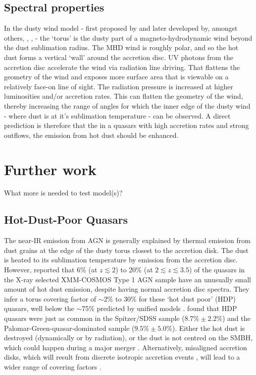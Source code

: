 \subsection{Spectral properties}

In the dusty wind model - first proposed by \citet{konigl94} and later developed by, amongst others, \citet{everett05}, \citet{elitzur06}, \citet{keating12} - the `torus' is the dusty part of a magneto-hydrodynamic wind beyond the dust sublimation radius. 
The MHD wind is roughly polar, and so the hot dust forms a vertical `wall' around the accretion disc.  
UV photons from the accretion disc accelerate the wind via radiation line driving. 
That flattens the geometry of the wind and exposes more surface area that is viewable on a relatively face-on line of sight.  
The radiation pressure is increased at higher luminosities and/or accretion rates.
This can flatten the geometry of the wind, thereby increasing the range of angles for which the inner edge of the dusty wind - where dust is at it's sublimation temperature - can be observed. 
A direct prediction is therefore that the in a quasars with high accretion rates and strong outflows, the emission from hot dust should be enhanced. 


\section{Further work}

What more is needed to test model(s)?  

\subsection{Hot-Dust-Poor Quasars}

The near-IR emission from AGN is generally explained by thermal emission from dust grains at the edge of the dusty torus closest to the accretion disk. 
The dust is heated to its sublimation temperature \citep[1300-2000K][]{barvainis92} by emission from the accretion disc. However, \citet{hao10} reported that 6\% (at $z \lesssim 2$) to 20\% (at $2 \lesssim z \lesssim 3.5$) of the quasars in the X-ray selected XMM-COSMOS Type 1 AGN sample \citep{brusa10} have an unusually small amount of hot dust emission, despite having normal accretion disc spectra. 
They infer a torus covering factor of  $\sim$2\% to 30\% for these `hot dust poor' (HDP) quasars, well below the $\sim$75\% predicted by unified models \citep[e.g.][]{krolik88}. 
\citet{hao11} found that HDP quasars were just as common in the \citet{richards06} Spitzer/SDSS sample ($8.7\% \pm 2.2\%$) and the \citet{elvis94} Palomar-Green-quasar-dominated sample ($9.5\% \pm 5.0\%$). 
Either the hot dust is destroyed (dynamically or by radiation), or the dust is not centred on the SMBH, which could happen during a major merger \citep[e.g.][]{blecha11}. 
Alternatively, misaligned accretion disks, which will result from discrete isotropic accretion events \citep{volonteri07}, will lead to a wider range of covering factors \citep{lawrence10}. 


